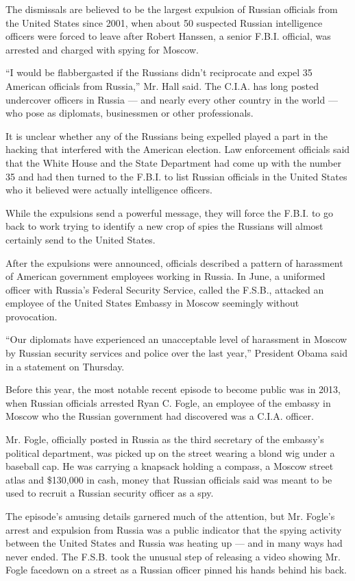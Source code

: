 The dismissals are believed to be the largest expulsion of Russian
officials from the United States since 2001, when about 50 suspected
Russian intelligence officers were forced to leave after Robert Hanssen,
a senior F.B.I. official, was arrested and charged with spying for
Moscow.

``I would be flabbergasted if the Russians didn't reciprocate and expel
35 American officials from Russia,'' Mr. Hall said. The C.I.A. has long
posted undercover officers in Russia --- and nearly every other country
in the world --- who pose as diplomats, businessmen or other
professionals.

It is unclear whether any of the Russians being expelled played a part
in the hacking that interfered with the American election. Law
enforcement officials said that the White House and the State Department
had come up with the number 35 and had then turned to the F.B.I. to list
Russian officials in the United States who it believed were actually
intelligence officers.

While the expulsions send a powerful message, they will force the F.B.I.
to go back to work trying to identify a new crop of spies the Russians
will almost certainly send to the United States.

After the expulsions were announced, officials described a pattern of
harassment of American government employees working in Russia. In June,
a uniformed officer with Russia's Federal Security Service, called the
F.S.B., attacked an employee of the United States Embassy in Moscow
seemingly without provocation.

``Our diplomats have experienced an unacceptable level of harassment in
Moscow by Russian security services and police over the last year,''
President Obama said in a statement on Thursday.

Before this year, the most notable recent episode to become public was
in 2013, when Russian officials arrested Ryan C. Fogle, an employee of
the embassy in Moscow who the Russian government had discovered was a
C.I.A. officer.

Mr. Fogle, officially posted in Russia as the third secretary of the
embassy's political department, was picked up on the street wearing a
blond wig under a baseball cap. He was carrying a knapsack holding a
compass, a Moscow street atlas and \$130,000 in cash, money that Russian
officials said was meant to be used to recruit a Russian security
officer as a spy.

The episode's amusing details garnered much of the attention, but Mr.
Fogle's arrest and expulsion from Russia was a public indicator that the
spying activity between the United States and Russia was heating up ---
and in many ways had never ended. The F.S.B. took the unusual step of
releasing a video showing Mr. Fogle facedown on a street as a Russian
officer pinned his hands behind his back.

